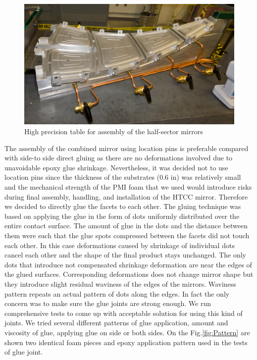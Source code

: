 \begin{figure}[ht]
    \centering
    \includegraphics[width=1.0\linewidth]{images/Half-sector_assem_tb2.JPG}
    \caption{High precision table for assembly of the half-sector mirrors}
    \label{fig:Half-sector_assem_tb2}
\end{figure}

\indent The assembly of the combined mirror using location pins is preferable compared with side-to side direct gluing as there are no deformations involved due to unavoidable epoxy glue shrinkage. Nevertheless, it was decided not to use location pins since the thickness of the substrates (0.6 in) was relatively small and the mechanical strength of the PMI foam that we used would introduce risks during final assembly, handling, and installation of the HTCC mirror. Therefore we decided to directly glue the facets to each other. The gluing technique was based on applying the glue in the form of dots uniformly distributed over the entire contact surface. The amount of glue in the dots and the distance between them were such that the glue spots compressed between the facets did not touch each other. In this case deformations caused by shrinkage of individual dots cancel each other and the shape of the final product stays unchanged. The only dots that introduce not compensated shrinkage deformation are near the edges of the glued surfaces. Corresponding deformations does not change mirror shape but they introduce slight residual waviness of the edges of the mirrors. Waviness pattern repeats an actual pattern of dots along the edges. In fact the only concern was to make sure the glue joints are strong enough. We run comprehensive tests to come up with acceptable solution for using this kind of joints. We  tried several different patterns of glue application, amount and viscosity of glue, applying glue on side or both sides.
On the Fig.\ref{fig:Pattern} are shown two identical foam pieces and epoxy application pattern used in the tests of glue joint. 

